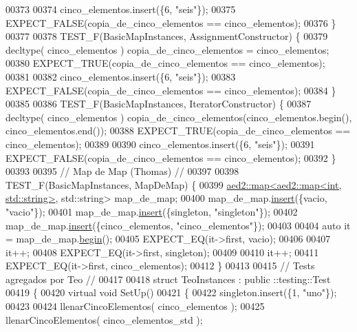 \begin{DoxyCode}
00373 
00374     cinco\_elementos.insert(\{6, \textcolor{stringliteral}{"seis"}\});
00375     EXPECT\_FALSE(copia\_de\_cinco\_elementos == cinco\_elementos);
00376 \}
00377 
00378 TEST\_F(BasicMapInstances, AssignmentConstructor) \{
00379     decltype( cinco\_elementos ) copia\_de\_cinco\_elementos = cinco\_elementos;
00380     EXPECT\_TRUE(copia\_de\_cinco\_elementos == cinco\_elementos);
00381 
00382     cinco\_elementos.insert(\{6, \textcolor{stringliteral}{"seis"}\});
00383     EXPECT\_FALSE(copia\_de\_cinco\_elementos == cinco\_elementos);
00384 \}
00385 
00386 TEST\_F(BasicMapInstances, IteratorConstructor) \{
00387     decltype( cinco\_elementos ) copia\_de\_cinco\_elementos(cinco\_elementos.begin(), cinco\_elementos.end());
00388     EXPECT\_TRUE(copia\_de\_cinco\_elementos == cinco\_elementos);
00389 
00390     cinco\_elementos.insert(\{6, \textcolor{stringliteral}{"seis"}\});
00391     EXPECT\_FALSE(copia\_de\_cinco\_elementos == cinco\_elementos);
00392 \}
00393 
00395 \textcolor{comment}{// Map de Map (Thomas) //}
00397 \textcolor{comment}{}
00398 TEST\_F(BasicMapInstances, MapDeMap) \{
00399     \hyperlink{classaed2_1_1map}{aed2::map<aed2::map<int, std::string>}, std::string> map\_de\_map;
00400     map\_de\_map.\hyperlink{classaed2_1_1map_a6941cde9a79c27f054b5c97a587a1854_a6941cde9a79c27f054b5c97a587a1854}{insert}(\{vacio, \textcolor{stringliteral}{"vacio"}\});
00401     map\_de\_map.\hyperlink{classaed2_1_1map_a6941cde9a79c27f054b5c97a587a1854_a6941cde9a79c27f054b5c97a587a1854}{insert}(\{singleton, \textcolor{stringliteral}{"singleton"}\});
00402     map\_de\_map.\hyperlink{classaed2_1_1map_a6941cde9a79c27f054b5c97a587a1854_a6941cde9a79c27f054b5c97a587a1854}{insert}(\{cinco\_elementos, \textcolor{stringliteral}{"cinco\_elementos"}\});
00403 
00404     \textcolor{keyword}{auto} it = map\_de\_map.\hyperlink{classaed2_1_1map_a58a95705d54b3dda7f775ce5a22225cb_a58a95705d54b3dda7f775ce5a22225cb}{begin}();
00405     EXPECT\_EQ(it->first, vacio);
00406 
00407     it++;
00408     EXPECT\_EQ(it->first, singleton);
00409 
00410     it++;
00411     EXPECT\_EQ(it->first, cinco\_elementos);
00412 \}
00413 
00415 \textcolor{comment}{// Tests agregados por Teo //}
00417 \textcolor{comment}{}
00418 \textcolor{keyword}{struct }TeoInstances : \textcolor{keyword}{public} ::testing::Test
00419 \{
00420     \textcolor{keyword}{virtual} \textcolor{keywordtype}{void} SetUp()
00421     \{
00422         singleton.insert(\{1, \textcolor{stringliteral}{"uno"}\});
00423 
00424         llenarCincoElementos( cinco\_elementos );
00425         llenarCincoElementos( cinco\_elementos\_std );

\end{DoxyCode}
